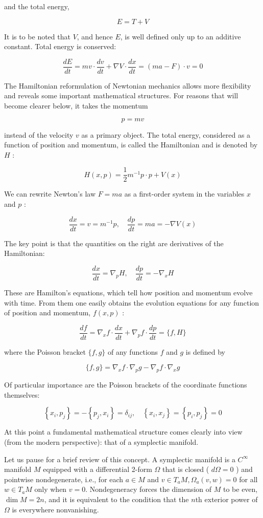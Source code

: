 \documentclass[10pt, letterpaper]{article}
\begin{document}
and the total energy,

$$
E=T+V
$$

It is to be noted that $V$, and hence $E$, is well defined only up to an additive constant. Total energy is conserved:

$$
\frac{d E}{d t}=m v \cdot \frac{d v}{d t}+\nabla V \cdot \frac{d x}{d t}=(m a-F) \cdot v=0
$$

The Hamiltonian reformulation of Newtonian mechanics allows more flexibility and reveals some important mathematical structures. For reasons that will become clearer below, it takes the momentum

$$
p=m v
$$

instead of the velocity $v$ as a primary object. The total energy, considered as a function of position and momentum, is called the Hamiltonian and is denoted by $H$ :

$$
H(x, p)=\frac{1}{2} m^{-1} p \cdot p+V(x)
$$

We can rewrite Newton's law $F=m a$ as a first-order system in the variables $x$ and $p$ :

$$
\frac{d x}{d t}=v=m^{-1} p, \quad \frac{d p}{d t}=m a=-\nabla V(x)
$$

The key point is that the quantities on the right are derivatives of the Hamiltonian:

$$
\frac{d x}{d t}=\nabla_{p} H, \quad \frac{d p}{d t}=-\nabla_{x} H
$$

These are Hamilton's equations, which tell how position and momentum evolve with time. From them one easily obtains the evolution equations for any function of position and momentum, $f(x, p)$ :

$$
\frac{d f}{d t}=\nabla_{x} f \cdot \frac{d x}{d t}+\nabla_{p} f \cdot \frac{d p}{d t}=\{f, H\}
$$

where the Poisson bracket $\{f, g\}$ of any functions $f$ and $g$ is defined by

$$
\{f, g\}=\nabla_{x} f \cdot \nabla_{p} g-\nabla_{p} f \cdot \nabla_{x} g
$$

Of particular importance are the Poisson brackets of the coordinate functions themselves:

$$
\left\{x_{i}, p_{j}\right\}=-\left\{p_{j}, x_{i}\right\}=\delta_{i j}, \quad\left\{x_{i}, x_{j}\right\}=\left\{p_{i}, p_{j}\right\}=0
$$

At this point a fundamental mathematical structure comes clearly into view (from the modern perspective): that of a symplectic manifold.

Let us pause for a brief review of this concept. A symplectic manifold is a $C^{\infty}$ manifold $M$ equipped with a differential 2-form $\Omega$ that is closed ( $d \Omega=0$ ) and pointwise nondegenerate, i.e., for each $a \in M$ and $v \in T_{a} M, \Omega_{a}(v, w)=0$ for all $w \in T_{a} M$ only when $v=0$. Nondegeneracy forces the dimension of $M$ to be even, $\operatorname{dim} M=2 n$, and it is equivalent to the condition that the $n$th exterior power of $\Omega$ is everywhere nonvanishing.
\end{document}
